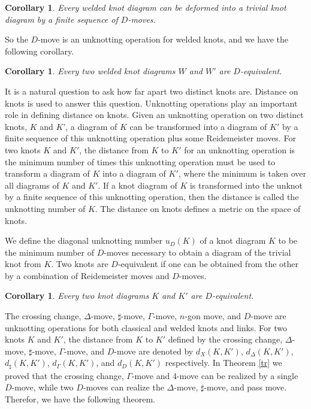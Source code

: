 \documentclass[12pt]{amsart}
\newtheorem{corollary}[theorem]{Corollary}
\theoremstyle{remark}
\begin{document}
\begin{corollary}
Every welded knot diagram can be deformed into a trivial knot diagram by a finite sequence of $D$-moves.
\end{corollary}

So the $D$-move is an unknotting operation for welded knots, and we have the following corollary.

\begin{corollary}
Every two welded knot diagrams $W$ and $W'$ are $D$-equivalent. 
\end{corollary}

It is a natural question to ask how far apart two distinct knots are. Distance on knots is used to answer this question. Unknotting operations play an important role in defining distance on knots. Given an unknotting operation on two distinct knots, $K$ and $K’$, a diagram of $K$ can be transformed into a diagram of $K'$ by a finite sequence of this unknotting operation plus some Reidemeister moves. For two knots $K$ and $K'$, the distance from $K$ to $K'$ for an unknotting operation is the minimum number of times this unknotting operation must be used to transform a diagram of $K$ into a diagram of $K'$, where the minimum is taken over all diagrams of $K$ and $K'$. If a knot diagram of $K$ is transformed into the unknot by a finite sequence of this unknotting operation, then the distance is called the unknotting number of $K$. The distance on knots defines a metric on the space of knots. 

We define the diagonal unknotting number $u_D(K)$ of a knot diagram $K$ to be the minimum number of $D$-moves necessary to obtain a diagram of the trivial knot from $K$. Two knots are $D$-equivalent if one can be obtained from the other by a combination of Reidemeister moves and $D$-moves.

\begin{corollary}
Every two knot diagrams $K$ and $K'$ are $D$-equivalent. 
\end{corollary}

The crossing change, $\Delta$-move, $\sharp$-move,  $\Gamma$-move, $n$-gon move, and $D$-move are unknotting operations for both classical and welded knots and links. For two knots $K$ and $K'$, the distance from $K$ to $K'$ defined by the crossing change, $\Delta$-move, $\sharp$-move,  $\Gamma$-move, and $D$-move are denoted by $d_{X}(K,K')$, $d_{\Delta}(K,K')$, $d_{\sharp}(K,K')$, $d_{\Gamma}(K,K')$, and $d_{D}(K,K')$ respectively. In Theorem \ref{tr} we proved that the crossing change, $\Gamma$-move and 4-move can be realized by a single $D$-move, while two $D$-moves can realize the $\Delta$-move,  $\sharp$-move, and pass move. Therefor, we have the following theorem.
\end{document}
